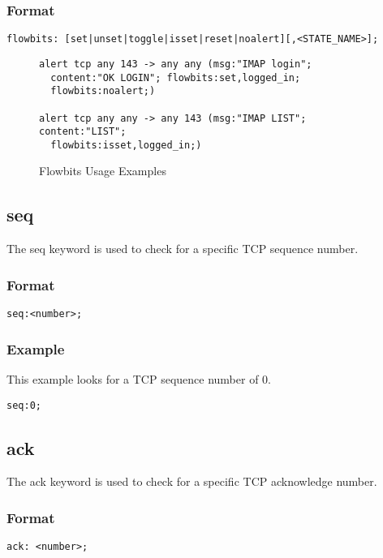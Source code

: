 \documentclass[english]{report}
\begin{document}
\subsubsection{Format}

\begin{verbatim}
flowbits: [set|unset|toggle|isset|reset|noalert][,<STATE_NAME>];
\end{verbatim}




\begin{figure}[!hbpt]
\begin{verbatim}
alert tcp any 143 -> any any (msg:"IMAP login"; 
  content:"OK LOGIN"; flowbits:set,logged_in; 
  flowbits:noalert;)
  
alert tcp any any -> any 143 (msg:"IMAP LIST"; content:"LIST"; 
  flowbits:isset,logged_in;)
\end{verbatim}

\caption{Flowbits Usage Examples\label{flowbits usage examples}}
\end{figure}

\subsection{seq}

The seq keyword is used to check for a specific TCP sequence number.

\subsubsection{Format}
\begin{verbatim}
seq:<number>;
\end{verbatim}

\subsubsection{Example}
This example looks for a TCP sequence number of 0.

\begin{verbatim}
seq:0;
\end{verbatim}


\subsection{ack}

The ack keyword is used to check for a specific TCP acknowledge number.

\subsubsection{Format}
\begin{verbatim}
ack: <number>;
\end{verbatim}
\end{document}
